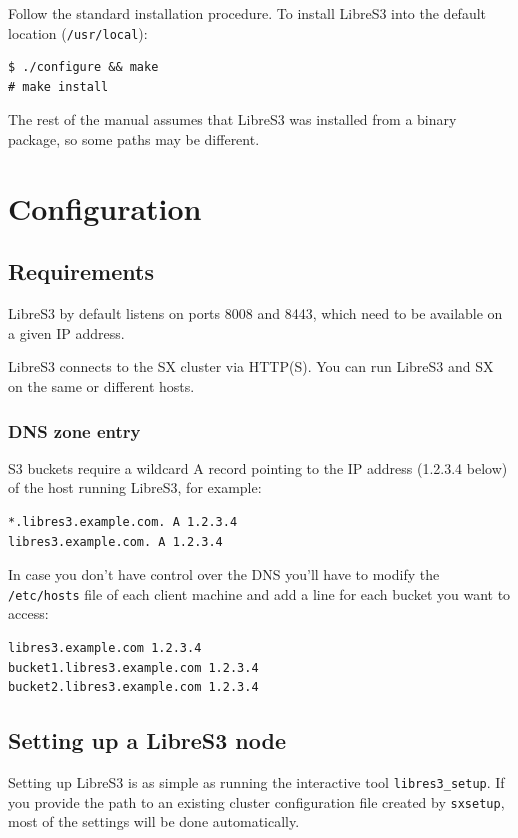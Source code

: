 Follow the standard installation procedure. To install
LibreS3 into the default location (\verb+/usr/local+):

\begin{lstlisting}
$ ./configure && make
# make install
\end{lstlisting}
The rest of the manual assumes that LibreS3 was installed from a binary
package, so some paths may be different.


\chapter{Configuration}

\section*{Requirements}

LibreS3 by default listens on ports 8008 and 8443, which need to be available on a given
IP address.

LibreS3 connects to the SX cluster via HTTP(S). You can run LibreS3 and SX
on the same or different hosts.

\subsection*{DNS zone entry}

S3 buckets require a wildcard A record pointing to the IP address (1.2.3.4 below) of the
host running LibreS3, for example:

\begin{lstlisting}
*.libres3.example.com. A 1.2.3.4
libres3.example.com. A 1.2.3.4
\end{lstlisting}


In case you don't have control over the DNS you'll have to modify the \verb|/etc/hosts| file
of each client machine and add a line for each bucket you want to access:

\begin{lstlisting}
libres3.example.com 1.2.3.4
bucket1.libres3.example.com 1.2.3.4
bucket2.libres3.example.com 1.2.3.4
\end{lstlisting}


\section*{Setting up a LibreS3 node}

Setting up LibreS3 is as simple as running the interactive tool \verb+libres3_setup+.
If you provide the path to an existing \SX cluster configuration file created
by \verb+sxsetup+, most of the settings will be done automatically.

